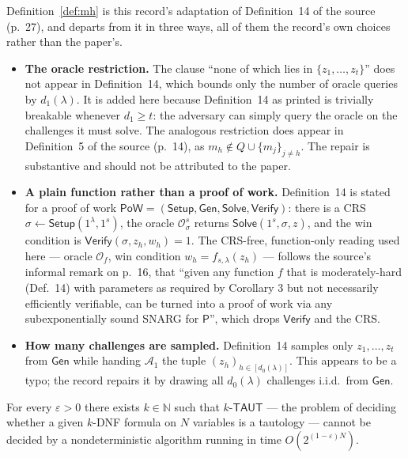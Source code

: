 \documentclass{conjura-conjecture}
\newcommand{\NN}{\mathbb{N}}
\newcommand{\Gen}{\mathsf{Gen}}
\newcommand{\Solve}{\mathsf{Solve}}
\newcommand{\Verify}{\mathsf{Verify}}
\newcommand{\Setup}{\mathsf{Setup}}
\newcommand{\Adv}{\mathcal{A}}
\newcommand{\Orc}{\mathcal{O}}
\newcommand{\TAUT}{\mathsf{TAUT}}
\begin{document}
\begin{remark}\label{rem:prov}
Definition~\ref{def:mh} is this record's adaptation of Definition~14 of the source (p.~27), and departs from it in three ways, all of them the record's own choices rather than the paper's.
\begin{itemize}
\item \textbf{The oracle restriction.} The clause ``none of which lies in $\{z_1,\dots,z_t\}$'' does not appear in Definition~14, which bounds only the number of oracle queries by $d_1(\lambda)$. It is added here because Definition~14 as printed is trivially breakable whenever $d_1 \ge t$: the adversary can simply query the oracle on the challenges it must solve. The analogous restriction does appear in Definition~5 of the source (p.~14), as $m_h \notin Q \cup \{m_j\}_{j \ne h}$. The repair is substantive and should not be attributed to the paper.
\item \textbf{A plain function rather than a proof of work.} Definition~14 is stated for a proof of work $\mathsf{PoW} = (\Setup, \Gen, \Solve, \Verify)$: there is a CRS $\sigma \leftarrow \Setup(1^{\lambda},1^{s})$, the oracle $\Orc^{s}_{\sigma}$ returns $\Solve(1^{s},\sigma,z)$, and the win condition is $\Verify(\sigma,z_h,w_h) = 1$. The CRS-free, function-only reading used here --- oracle $\Orc_f$, win condition $w_h = f_{s,\lambda}(z_h)$ --- follows the source's informal remark on p.~16, that ``given any function $f$ that is moderately-hard (Def.\ 14) with parameters as required by Corollary 3 but not necessarily efficiently verifiable, can be turned into a proof of work via any subexponentially sound SNARG for $\mathsf{P}$'', which drops $\Verify$ and the CRS.
\item \textbf{How many challenges are sampled.} Definition~14 samples only $z_1,\dots,z_t$ from $\Gen$ while handing $\Adv_1$ the tuple $(z_h)_{h \in [d_0(\lambda)]}$. This appears to be a typo; the record repairs it by drawing all $d_0(\lambda)$ challenges i.i.d.\ from $\Gen$.
\end{itemize}
\end{remark}

\begin{definition}[NSETH]\label{def:nseth}
For every $\varepsilon > 0$ there exists $k \in \NN$ such that $k$-$\TAUT$ --- the problem of deciding whether a given $k$-DNF formula on $N$ variables is a tautology --- cannot be decided by a nondeterministic algorithm running in time $O(2^{(1-\varepsilon)N})$.
\end{definition}
\end{document}
